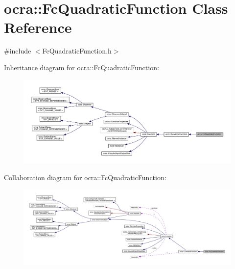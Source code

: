 \hypertarget{classocra_1_1FcQuadraticFunction}{}\section{ocra\+:\+:Fc\+Quadratic\+Function Class Reference}
\label{classocra_1_1FcQuadraticFunction}


{\ttfamily \#include $<$Fc\+Quadratic\+Function.\+h$>$}



Inheritance diagram for ocra\+:\+:Fc\+Quadratic\+Function\+:\nopagebreak
\begin{figure}[H]
\begin{center}
\leavevmode
\includegraphics[width=350pt]{d0/d8a/classocra_1_1FcQuadraticFunction__inherit__graph}
\end{center}
\end{figure}


Collaboration diagram for ocra\+:\+:Fc\+Quadratic\+Function\+:\nopagebreak
\begin{figure}[H]
\begin{center}
\leavevmode
\includegraphics[width=350pt]{d3/dbd/classocra_1_1FcQuadraticFunction__coll__graph}
\end{center}
\end{figure}
